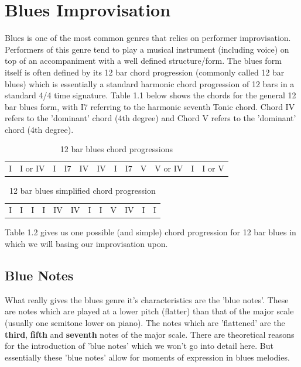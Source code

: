 \documentclass[pdftex,12pt,a4paper]{report}
\begin{document}
\section{Blues Improvisation}
Blues is one of the most common genres that relies on performer improvisation. Performers of this genre tend to play a musical instrument (including voice) on top of an accompaniment with a well defined structure/form. The blues form itself is often defined by its 12 bar chord progression (commonly called 12 bar blues) which is essentially a standard harmonic chord progression of 12 bars in a standard 4/4 time signature. Table 1.1 below shows the chords for the general 12 bar blues form, with I7 referring to the harmonic seventh Tonic chord. Chord IV refers to the 'dominant' chord (4th degree) and Chord V refers to the 'dominant' chord (4th degree).

\begin{table}[here]
\centering
{}
\begin{tabular}{|*{12}{C|}}
  I & I or IV & I & I7 & IV & IV & I & I7 & V & V or IV & I & I or V
\end{tabular}
\caption{12 bar blues chord progressions}
\label{12 bar blues}
\end{table}


\begin{table}[here]
\centering
{}
\begin{tabular}{|*{12}{C|}}
  I & I & I & I & IV & IV & I & I & V & IV & I & I
\end{tabular}
\caption{12 bar blues simplified chord progression}
\label{12 bar blues}
\end{table}

Table 1.2 gives us one possible (and simple) chord progression for 12 bar blues in which we will basing our improvisation upon. 

\subsection{Blue Notes} What really gives the blues genre it's characteristics are the 'blue notes'. These are notes which are played at a lower pitch (flatter) than that of the major scale (usually one semitone lower on piano). The notes which are 'flattened' are the \textbf{third}, \textbf{fifth} and \textbf{seventh} notes of the major scale.
There are theoretical reasons for the introduction of 'blue notes' which we won't go into detail here. But essentially these 'blue notes' allow for moments of expression in blues melodies. 
\end{document}
